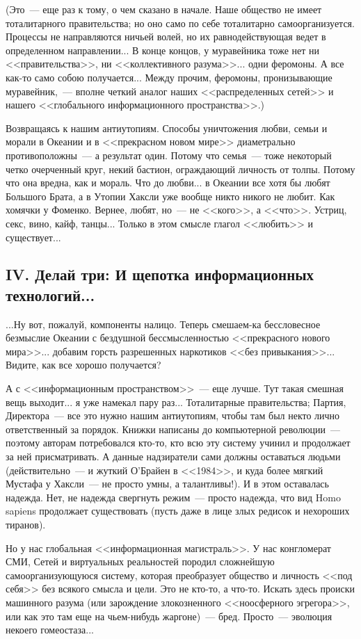 \documentclass{scrbook}
\newcommand{\flqq}{<<}
\newcommand{\frqq}{>>}
\newcommand{\mdash}{~--- }
\newcommand{\commamdash}{~--- } %
\newcommand{\essaysection}[1]{\subsection*{#1}\nopagebreak}
\begin{document}
(Это{\mdash}еще раз к тому, о чем сказано в начале. Наше общество не имеет тоталитарного правительства; но оно само по себе тоталитарно самоорганизуется. Процессы не направляются ничьей волей, но их равнодействующая ведет в определенном направлении... В конце концов, у муравейника тоже нет ни {\flqq}правительства{\frqq}, ни {\flqq}коллективного разума{\frqq}... одни феромоны. А все как-то само собою получается... Между прочим, феромоны, пронизывающие муравейник,{\commamdash}вполне четкий аналог наших {\flqq}распределенных сетей{\frqq} и нашего {\flqq}глобального информационного пространства{\frqq}.)

Возвращаясь к нашим антиутопиям. Способы уничтожения любви, семьи и морали в Океании и в {\flqq}прекрасном новом мире{\frqq} диаметрально противоположны{\mdash}а результат один. Потому что семья{\mdash}тоже некоторый четко очерченный круг, некий бастион, ограждающий личность от толпы. Потому что она вредна, как и мораль. Что до любви... в Океании все хотя бы любят Большого Брата, а в Утопии Хаксли уже вообще никто никого не любит. Как хомячки у Фоменко. Вернее, любят, но{\mdash}не {\flqq}кого{\frqq}, а {\flqq}что{\frqq}. Устриц, секс, вино, кайф, танцы... Только в этом смысле глагол {\flqq}любить{\frqq} и существует... 
       
\essaysection{IV. Делай три: И щепотка информационных технологий...}
       
...Ну вот, пожалуй, компоненты налицо. Теперь смешаем-ка бессловесное безмыслие Океании с бездушной бессмысленностью {\flqq}прекрасного нового мира{\frqq}... добавим горсть разрешенных наркотиков {\flqq}без привыкания{\frqq}... Видите, как все хорошо получается?

А с {\flqq}информационным пространством{\frqq}{\mdash}еще лучше. Тут такая смешная вещь выходит... я уже намекал пару раз... Тоталитарные правительства; Партия, Директора{\mdash}все это нужно нашим антиутопиям, чтобы там был некто лично ответственный за порядок. Книжки написаны до компьютерной революции{\mdash}поэтому авторам потребовался кто-то, кто всю эту систему учинил и продолжает за ней присматривать. А данные надзиратели сами должны оставаться людьми (действительно{\mdash}и жуткий О'Брайен в {\flqq}1984{\frqq}, и куда более мягкий Мустафа у Хаксли{\mdash}не просто умны, а талантливы!). И в этом оставалась надежда. Нет, не надежда свергнуть режим{\mdash}просто надежда, что вид Homo sapiens продолжает существовать (пусть даже в лице злых редисок и нехороших тиранов).
 
Но у нас глобальная {\flqq}информационная магистраль{\frqq}. У нас конгломерат СМИ, Сетей и виртуальных реальностей породил сложнейшую самоорганизующуюся систему, которая преобразует общество и личность {\flqq}под себя{\frqq} без всякого смысла и цели. Это не кто-то, а что-то. Искать здесь происки машинного разума (или зарождение злокозненного {\flqq}ноосферного эгрегора{\frqq}, или как это там еще на чьем-нибудь жаргоне){\mdash}бред. Просто{\mdash}эволюция некоего гомеостаза...
\end{document}
